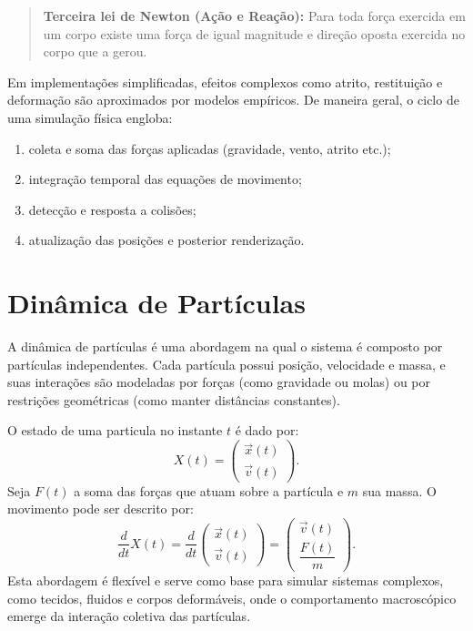 \begin{quote}
	\textbf{Terceira lei de Newton (Ação e Reação):}
	Para toda força exercida em um corpo existe uma força de igual magnitude e direção oposta exercida no corpo que a gerou.
\end{quote}

Em implementações simplificadas, efeitos complexos como atrito, restituição e deformação são aproximados por modelos empíricos. De maneira geral, o ciclo de uma simulação física engloba:
\begin{enumerate}
	\item coleta e soma das forças aplicadas (gravidade, vento, atrito etc.);
	\item integração temporal das equações de movimento;
	\item detecção e resposta a colisões;
	\item atualização das posições e posterior renderização.
\end{enumerate}

\section{Dinâmica de Partículas}

A dinâmica de partículas é uma abordagem na qual o sistema é composto por partículas independentes. Cada partícula possui posição, velocidade e massa, e suas interações são modeladas por forças (como gravidade ou molas) ou por restrições geométricas (como manter distâncias constantes). 

O estado de uma particula no instante $t$ é dado por:
$$
X(t) =
\begin{pmatrix}
	\vec x(t) \\
	\vec v(t)
\end{pmatrix}.
$$
Seja $F(t)$ a soma das forças que atuam sobre a partícula e $m$ sua massa. O movimento pode ser descrito por:
$$
	\frac{d}{dt} X(t)
	=
	\frac{d}{dt}
	\begin{pmatrix}
		\vec x(t) \\
		\vec v(t)
	\end{pmatrix}
	=
	\begin{pmatrix}
		\vec v(t) \\
		\dfrac{F(t)}{m}
	\end{pmatrix}.
$$
Esta abordagem é flexível e serve como base para simular sistemas complexos, como tecidos, fluidos e corpos deformáveis, onde o comportamento macroscópico emerge da interação coletiva das partículas.

